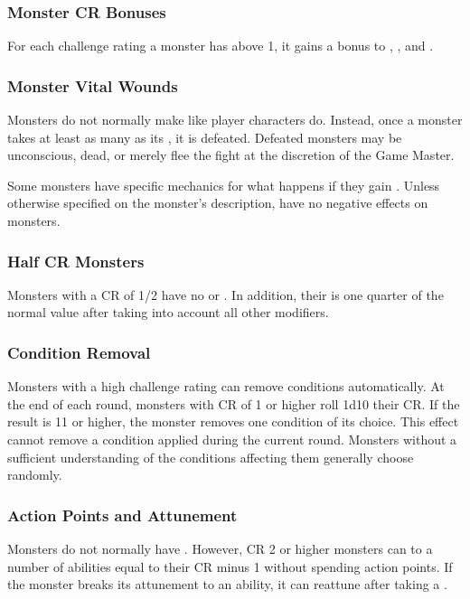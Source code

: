         \subsubsection{Monster CR Bonuses}
            For each challenge rating a monster has above 1, it gains a  bonus to , , and .

        \subsubsection{Monster Vital Wounds}
            Monsters do not normally make  like player characters do.
            Instead, once a monster takes at least as many  as its , it is defeated.
            Defeated monsters may be unconscious, dead, or merely flee the fight at the discretion of the Game Master.

            Some monsters have specific mechanics for what happens if they gain .
            Unless otherwise specified on the monster's description,  have no negative effects on monsters.

        \subsubsection{Half CR Monsters}\label{Half CR Monsters}
            Monsters with a CR of 1/2 have no  or .
            In addition, their  is one quarter of the normal value after taking into account all other modifiers.

        \subsubsection{Condition Removal}
            Monsters with a high challenge rating can remove conditions automatically.
            At the end of each round, monsters with CR of 1 or higher roll 1d10 \add their CR.
            If the result is 11 or higher, the monster removes one condition of its choice.
            This effect cannot remove a condition applied during the current round.
            Monsters without a sufficient understanding of the conditions affecting them generally choose randomly.

        \subsubsection{Action Points and Attunement}
            Monsters do not normally have .
            However, CR 2 or higher monsters can  to a number of abilities equal to their CR minus 1 without spending action points.
            If the monster breaks its attunement to an ability, it can reattune after taking a .

